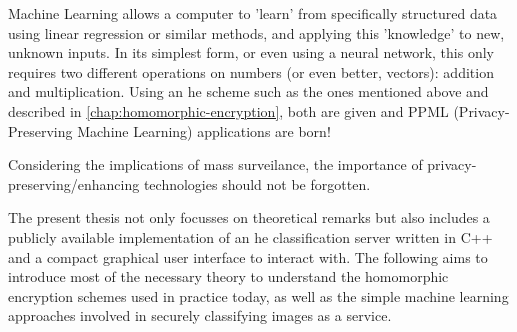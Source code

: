 Machine Learning allows a computer to 'learn' from specifically structured data using linear regression or similar methods, and applying this 'knowledge' to new, unknown inputs.
In its simplest form, or even using a neural network, this only requires two different operations on numbers (or even better, vectors): addition and multiplication.
Using an \gls{he} scheme such as the ones mentioned above and described in \autoref{chap:homomorphic-encryption}, both are given and PPML (Privacy-Preserving Machine Learning) applications are born!

Considering the implications of mass surveilance, the importance of privacy-preserving/enhancing technologies should not be forgotten.

The present thesis not only focusses on theoretical remarks but also includes a publicly available implementation of an \gls{he} classification server written in C++ and a compact graphical user interface to interact with.
The following aims to introduce most of the necessary theory to understand the homomorphic encryption schemes used in practice today, as well as the simple machine learning approaches involved in securely classifying images as a service.
